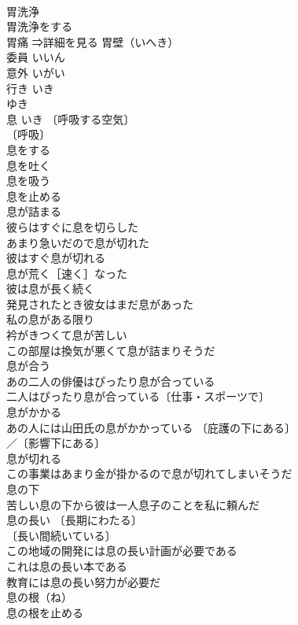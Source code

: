 \documentclass[8pt]{extreport}
\begin{document}
\begin{CJK}{UTF8}{min}
\\	胃洗浄 
\\	胃洗浄をする 
\\	胃痛 ⇒詳細を見る 胃壁（いへき） 
\\	委員	いいん	
\\	意外	いがい	
\\	行き	いき 
\\	ゆき	
\\	息	いき	〔呼吸する空気〕
\\	〔呼吸〕
\\	息をする 
\\	息を吐く 
\\	息を吸う 
\\	息を止める 
\\	息が詰まる 
\\	彼らはすぐに息を切らした 
\\	あまり急いだので息が切れた 
\\	彼はすぐ息が切れる 
\\	息が荒く［速く］なった 
\\	彼は息が長く続く 
\\	発見されたとき彼女はまだ息があった 
\\	私の息がある限り 
\\	衿がきつくて息が苦しい 
\\	この部屋は換気が悪くて息が詰まりそうだ 
\\	息が合う 
\\	あの二人の俳優はぴったり息が合っている 
\\	二人はぴったり息が合っている〔仕事・スポーツで〕 
\\	息がかかる 
\\	あの人には山田氏の息がかかっている 〔庇護の下にある〕
\\	／〔影響下にある〕
\\	息が切れる 
\\	この事業はあまり金が掛かるので息が切れてしまいそうだ 
\\	息の下 
\\	苦しい息の下から彼は一人息子のことを私に頼んだ 
\\	息の長い 〔長期にわたる〕
\\	〔長い間続いている〕
\\	この地域の開発には息の長い計画が必要である 
\\	これは息の長い本である 
\\	教育には息の長い努力が必要だ 
\\	息の根（ね）　
\\	息の根を止める 

\end{CJK}
\end{document}
